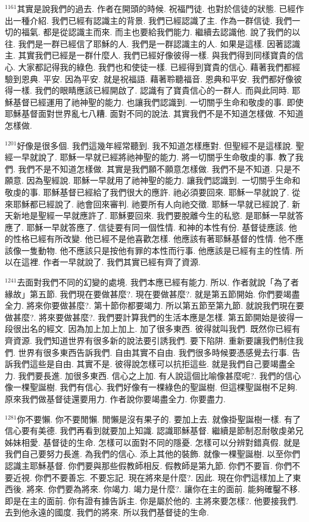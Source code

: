 \documentclass{book}
\begin{document}
$^{1161}$其實是說我們的過去.
作者在開頭的時候.
祝福門徒.
也對於信徒的狀態.
已經作出一種介紹.
我們已經有認識主的背景.
我們已經認識了主.
作為一群信徒.
我們一切的福氣.
都是從認識主而來.
而主也要給我們能力.
繼續去認識他.
說了我們的以往.
我們是一群已經信了耶穌的人.
我們是一群認識主的人.
如果是這樣.
因著認識主.
其實我們已經是一群什麼人.
我們已經好像彼得一樣.
與我們得到同樣寶貴的信心.
大家都記得我的綠色.
我們也和使徒一樣.
已經得到寶貴的信心.
藉著我們都經驗到恩典.
平安.
因為平安.
就是祝福語.
藉著聆聽福音.
恩典和平安.
我們都好像彼得一樣.
我們的眼睛應該已經開啟了.
認識有了寶貴信心的一群人.
而與此同時.
耶穌基督已經運用了祂神聖的能力.
也讓我們認識到.
一切關乎生命和敬虔的事.
即使耶穌基督面對世界亂七八糟.
面對不同的說法.
其實我們不是不知道怎樣做.
不知道怎樣做.

$^{1201}$好像是很多個.
我們這幾年經常聽到.
我不知道怎樣應對.
但聖經不是這樣說.
聖經一早就說了.
耶穌一早就已經將祂神聖的能力.
將一切關乎生命敬虔的事.
教了我們.
我們不是不知道怎樣做.
其實是我們願不願意怎樣做.
我們不是不知道.
只是不願意.
因為聖經說.
耶穌一早就用了祂神聖的能力.
讓我們認識到.
一切關乎生命和敬虔的事.
耶穌基督已經給了我們很大的應許.
祂必須要回來.
耶穌一早就說了.
從來耶穌都已經說了.
祂會回來審判.
祂要所有人向祂交徵.
耶穌一早就已經說了.
新天新地是聖經一早就應許了.
耶穌要回來.
我們要脫離今生的私慾.
是耶穌一早就答應了.
耶穌一早就答應了.
信徒要有同一個性情.
和神的本性有份.
基督徒應該.
他的性格已經有所改變.
他已經不是他喜歡怎樣.
他應該有著耶穌基督的性情.
他不應該像一隻動物.
他不應該只是按他有罪的本性而行事.
他應該是已經有主的性情.
所以在這裡.
作者一早就說了.
我們其實已經有齊了資源.

$^{1241}$去面對我們不同的幻變的處境.
我們本應已經有能力.
所以.
作者就說「為了者緣故」第五節.
我們現在要做甚麼?.
現在要做甚麼?.
就是第五節開始.
你們要竭盡全力.
將來你要做甚麼?.
第十節你都要竭力.
所以第五節至第九節.
就說我們現在要做甚麼?.
將來要做甚麼?.
我們要計算我們的生活本應是怎樣.
第五節開始是彼得一段很出名的經文.
因為加上加上加上.
加了很多東西.
彼得就叫我們.
既然你已經有齊資源.
我們知道世界有很多新的說法要引誘我們.
要下陷阱.
重新要讓我們制住我們.
世界有很多東西告訴我們.
自由其實不自由.
我們很多時候要憑感覺去行事.
告訴我們這些是自由.
其實不是.
彼得說怎樣可以抗拒這些.
就是我們自己要竭盡全力.
我們要長進.
加很多東西.
信心之上加.
有人說這個比喻像甚麼呢?.
我們的信心像一棵聖誕樹.
我們有信心.
我們好像有一棵綠色的聖誕樹.
但這棵聖誕樹不足夠.
原來我們做基督徒還要用力.
作者說你要竭盡全力.
你要盡力.

$^{1281}$你不要懶.
你不要閒懶.
閒懶是沒有果子的.
要加上去.
就像掛聖誕樹一樣.
有了信心要有美德.
我們再看到就要加上知識.
認識耶穌基督.
繼續是節制忍耐敬虔弟兄姊妹相愛.
基督徒的生命.
怎樣可以面對不同的隱憂.
怎樣可以分辨對錯真假.
就是我們自己要努力長進.
為我們的信心.
添上其他的裝飾.
就像一棵聖誕樹.
以至你們認識主耶穌基督.
你們要與那些假教師相反.
假教師是第九節.
你們不要盲.
你們不要近視.
你們不要善忘.
不要忘記.
現在將來是什麼?.
因此.
現在你們這樣加上了東西後.
將來.
你們要為將來.
你竭力.
竭力是什麼?.
讓你在主的面前.
能夠確鑿不移.
即是在主的面前.
你有證有據告訴主.
你是屬於他的.
主將來要怎樣?.
他要接我們.
去到他永遠的國度.
我們的將來.
所以我們基督徒的生命.
\end{document}
